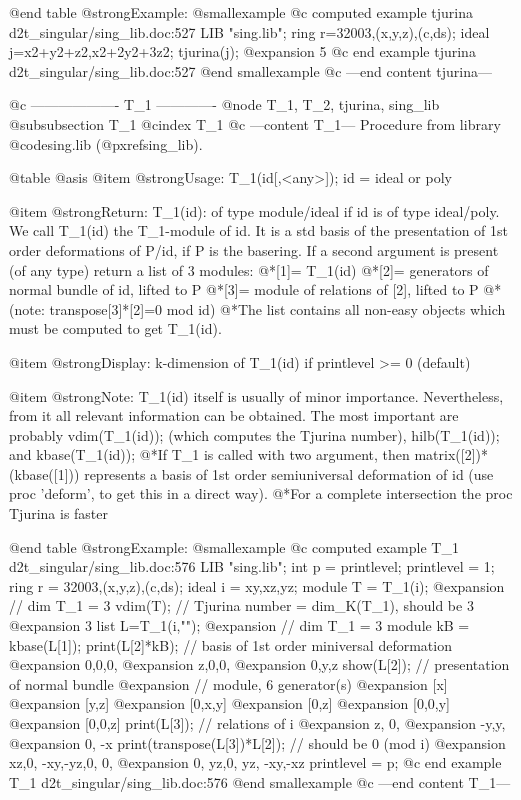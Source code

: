@end table
@strong{Example:}
@smallexample
@c computed example tjurina d2t_singular/sing_lib.doc:527 
LIB "sing.lib";
ring r=32003,(x,y,z),(c,ds);
ideal j=x2+y2+z2,x2+2y2+3z2;
tjurina(j);
@expansion{} 5
@c end example tjurina d2t_singular/sing_lib.doc:527
@end smallexample
@c ---end content tjurina---

@c ------------------- T_1 -------------
@node T_1, T_2, tjurina, sing_lib
@subsubsection T_1
@cindex T_1
@c ---content T_1---
Procedure from library @code{sing.lib} (@pxref{sing_lib}).

@table @asis
@item @strong{Usage:}
T_1(id[,<any>]); id = ideal or poly

@item @strong{Return:}
T_1(id): of type module/ideal if id is of type ideal/poly.
We call T_1(id) the T_1-module of id. It is a std basis of the
presentation of 1st order deformations of P/id, if P is the basering.
If a second argument is present (of any type) return a list of
3 modules:
@*[1]= T_1(id)
@*[2]= generators of normal bundle of id, lifted to P
@*[3]= module of relations of [2], lifted to P
@*(note: transpose[3]*[2]=0 mod id)
@*The list contains all non-easy objects which must be computed
to get T_1(id).

@item @strong{Display:}
k-dimension of T_1(id) if printlevel >= 0 (default)

@item @strong{Note:}
T_1(id) itself is usually of minor importance. Nevertheless, from it
all relevant information can be obtained. The most important are
probably vdim(T_1(id)); (which computes the Tjurina number),
hilb(T_1(id)); and kbase(T_1(id));
@*If T_1 is called with two argument, then matrix([2])*(kbase([1]))
represents a basis of 1st order semiuniversal deformation of id
(use proc 'deform', to get this in a direct way).
@*For a complete intersection the proc Tjurina is faster

@end table
@strong{Example:}
@smallexample
@c computed example T_1 d2t_singular/sing_lib.doc:576 
LIB "sing.lib";
int p      = printlevel;
printlevel = 1;
ring r     = 32003,(x,y,z),(c,ds);
ideal i    = xy,xz,yz;
module T   = T_1(i);
@expansion{} // dim T_1 = 3
vdim(T);                      // Tjurina number = dim_K(T_1), should be 3
@expansion{} 3
list L=T_1(i,"");
@expansion{} // dim T_1 = 3
module kB  = kbase(L[1]);
print(L[2]*kB);               // basis of 1st order miniversal deformation
@expansion{} 0,0,0,
@expansion{} z,0,0,
@expansion{} 0,y,z 
show(L[2]);                   // presentation of normal bundle
@expansion{} // module, 6 generator(s)
@expansion{} [x]
@expansion{} [y,z]
@expansion{} [0,x,y]
@expansion{} [0,z]
@expansion{} [0,0,y]
@expansion{} [0,0,z]
print(L[3]);                  // relations of i
@expansion{} z, 0,
@expansion{} -y,y,
@expansion{} 0, -x
print(transpose(L[3])*L[2]);  // should be 0 (mod i)
@expansion{} xz,0, -xy,-yz,0,  0, 
@expansion{} 0, yz,0,  yz, -xy,-xz
printlevel = p;
@c end example T_1 d2t_singular/sing_lib.doc:576
@end smallexample
@c ---end content T_1---

